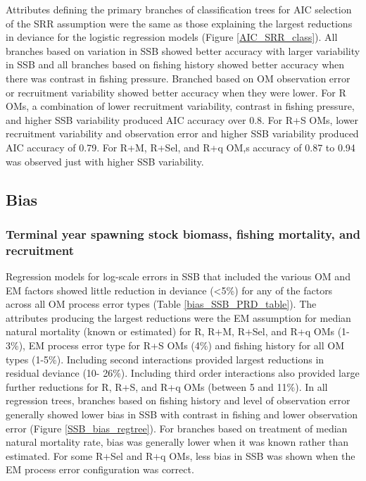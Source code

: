 \documentclass[
  12pt,
]{article}
\begin{document}
Attributes defining the primary branches of classification trees for AIC
selection of the SRR assumption were the same as those explaining the
largest reductions in deviance for the logistic regression models
(Figure \ref{AIC_SRR_class}). All branches based on variation in SSB
showed better accuracy with larger variability in SSB and all branches
based on fishing history showed better accuracy when there was contrast
in fishing pressure. Branched based on OM observation error or
recruitment variability showed better accuracy when they were lower. For
R OMs, a combination of lower recruitment variability, contrast in
fishing pressure, and higher SSB variability produced AIC accuracy over
0.8. For R+S OMs, lower recruitment variability and observation error
and higher SSB variability produced AIC accuracy of 0.79. For R+M,
R+Sel, and R+q OM,s accuracy of 0.87 to 0.94 was observed just with
higher SSB variability.

\subsection*{Bias}\label{bias-1}

\subsubsection*{Terminal year spawning stock biomass, fishing mortality,
and
recruitment}\label{terminal-year-spawning-stock-biomass-fishing-mortality-and-recruitment}

Regression models for log-scale errors in SSB that included the various
OM and EM factors showed little reduction in deviance (\textless5\%) for
any of the factors across all OM process error types (Table
\ref{bias_SSB_PRD_table}). The attributes producing the largest
reductions were the EM assumption for median natural mortality (known or
estimated) for R, R+M, R+Sel, and R+q OMs (1-3\%), EM process error type
for R+S OMs (4\%) and fishing history for all OM types (1-5\%).
Including second interactions provided largest reductions in residual
deviance (10- 26\%). Including third order interactions also provided
large further reductions for R, R+S, and R+q OMs (between 5 and 11\%).
In all regression trees, branches based on fishing history and level of
observation error generally showed lower bias in SSB with contrast in
fishing and lower observation error (Figure \ref{SSB_bias_regtree}). For
branches based on treatment of median natural mortality rate, bias was
generally lower when it was known rather than estimated. For some R+Sel
and R+q OMs, less bias in SSB was shown when the EM process error
configuration was correct.
\end{document}
